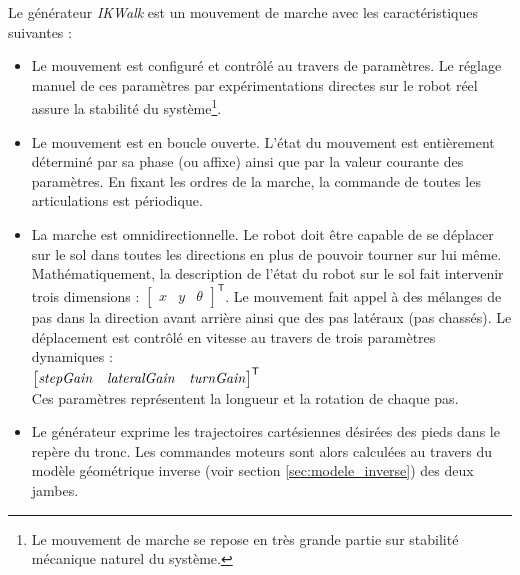 Le générateur \textit{IKWalk} est un mouvement de marche avec 
les caractéristiques suivantes :
\begin{itemize}
    \item Le mouvement est configuré et contrôlé au travers de paramètres.
        Le réglage manuel de ces paramètres par expérimentations directes sur 
        le robot réel assure la stabilité 
        du système\footnote{Le mouvement de marche se repose en très grande 
        partie sur stabilité mécanique naturel du système.}.
    \item Le mouvement est en boucle ouverte. 
        L'état du mouvement est entièrement déterminé par sa phase 
        (ou affixe) ainsi que par la valeur courante des paramètres.
        En fixant les ordres de la marche, la commande de toutes 
        les articulations est périodique.
    \item La marche est omnidirectionnelle. 
        Le robot doit être capable de se déplacer sur le sol dans toutes
        les directions en plus de pouvoir tourner sur lui même.
        Mathématiquement, la description de l'état du robot sur le
        sol fait intervenir trois dimensions : 
        $\begin{bmatrix}x & y & \theta\end{bmatrix}^{\mathsf{T}}$.
        Le mouvement fait appel à des mélanges de pas dans la direction 
        avant arrière ainsi que des pas latéraux (pas chassés).
        Le déplacement est contrôlé en vitesse au travers de trois paramètres dynamiques :\\
        $\begin{bmatrix}\text{\textit{stepGain}} & \text{\textit{lateralGain}} 
        & \text{\textit{turnGain}}\end{bmatrix}^{\mathsf{T}}$\\
        Ces paramètres représentent la longueur et la rotation de chaque pas.
    \item Le générateur exprime les trajectoires cartésiennes 
        désirées des pieds dans le repère du tronc. 
        Les commandes moteurs sont alors calculées au travers du 
        modèle géométrique inverse (voir section \ref{sec:modele_inverse}) 
        des deux jambes.
\end{itemize}

